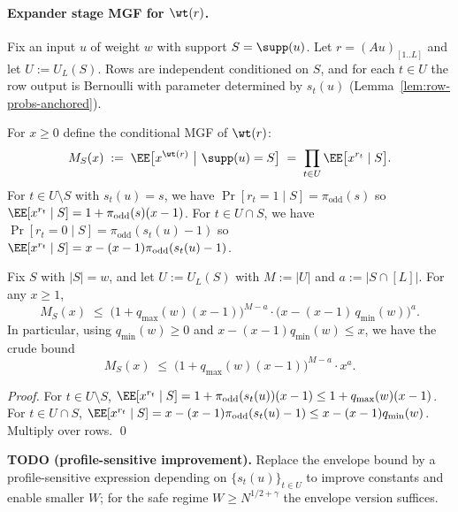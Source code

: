 \paragraph{Expander stage MGF for $\wt(r)$.}
Fix an input $u$ of weight $w$ with support $S=\supp(u)$.
Let $r=(Au)_{[1..L]}$ and let $U:=U_L(S)$.
Rows are independent conditioned on $S$, and for each $t\in U$ the row output is Bernoulli with parameter determined by
$s_t(u)$ (Lemma~\ref{lem:row-probs-anchored}).

For $x\ge 0$ define the conditional MGF of $\wt(r)$:
\[
M_S(x)\;:=\;\EE\big[x^{\wt(r)}\ \big|\ \supp(u)=S\big]
\;=\;
\prod_{t\in U} \EE\big[x^{r_t}\mid S\big].
\]
For $t\in U\setminus S$ with $s_t(u)=s$, we have $\Pr[r_t=1\mid S]=\pi_{\mathrm{odd}}(s)$ so
$\EE[x^{r_t}\mid S]=1+\pi_{\mathrm{odd}}(s)(x-1)$.
For $t\in U\cap S$, we have $\Pr[r_t=0\mid S]=\pi_{\mathrm{odd}}(s_t(u)-1)$ so
$\EE[x^{r_t}\mid S]=x-(x-1)\pi_{\mathrm{odd}}(s_t(u)-1)$.

\begin{lemma}
\label{lem:expander-mgf-envelope}
Fix $S$ with $|S|=w$, and let $U:=U_L(S)$ with $M:=|U|$ and $a:=|S\cap[L]|$.
For any $x\ge 1$,
\[
M_S(x)
\;\le\;
\big(1+q_{\max}(w)(x-1)\big)^{M-a}\cdot \big(x-(x-1)\,q_{\min}(w)\big)^{a}.
\]
In particular, using $q_{\min}(w)\ge 0$ and $x-(x-1)q_{\min}(w)\le x$, we have the crude bound
\[
M_S(x)\;\le\;\big(1+q_{\max}(w)(x-1)\big)^{M-a}\cdot x^{a}.
\]
\end{lemma}

\begin{proof}
For $t\in U\setminus S$, $\EE[x^{r_t}\mid S]=1+\pi_{\mathrm{odd}}(s_t(u))(x-1)\le 1+q_{\max}(w)(x-1)$.
For $t\in U\cap S$, $\EE[x^{r_t}\mid S]=x-(x-1)\pi_{\mathrm{odd}}(s_t(u)-1)\le x-(x-1)q_{\min}(w)$.
Multiply over rows. \qed
\end{proof}

\noindent\textbf{TODO (profile-sensitive improvement).}
Replace the envelope bound by a profile-sensitive expression depending on $\{s_t(u)\}_{t\in U}$ to improve constants and
enable smaller $W$; for the safe regime $W\ge N^{1/2+\gamma}$ the envelope version suffices.

